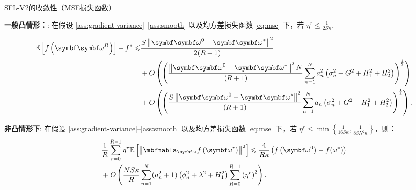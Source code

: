 \begin{theorem}{SFL-V2的收敛性（MSE损失函数）}\label{theorem-v2-full-mse}

\noindent \textbf{一般凸情形：}:  在假设 \ref{ass:gradient-variance}--\ref{ass:smooth} 以及均方差损失函数 \eqref{eq:mse} 下，若 $\eta^r \leq \frac{1}{2 S\kappa}$, 

\begin{equation}\label{bound-v2-gc-full}
\begin{aligned}
\mathbb{E}\left[f\left(\boldsymbol{\omegab}^{R}\right)\right]-f^*\le &\frac{S\left\|\boldsymbol{\omegab}^{0}-\boldsymbol{\omegab}^{\ast}\right\|^2}{2(R+1)}\\ 
&+ O\left(\left(\frac{\left\|\boldsymbol{\omegab}^{0}-\boldsymbol{\omegab}^{\ast}\right\|^2 N}{(R+1)}\sum_{n=1}^Na_n^2\left(\sigma_n^2+G^2+H_1^2+H_2^2\right)\right)^{\frac{1}{2}}\right)\\
    &+O\left(\left(\frac{S \left\|\boldsymbol{\omegab}^{0}-\boldsymbol{\omegab}^{\ast}\right\|^2}{(R+1)}\sum_{n=1}^Na_n\left(\sigma_n^2+G^2+H_1^2+H_2^2\right)\right)^{\frac{1}{3}}\right).
\end{aligned}
\end{equation}

\noindent \textbf{非凸情形下}: 在假设 \ref{ass:gradient-variance}--\ref{ass:smooth} 以及均方差损失函数 \eqref{eq:mse} 下，若 
$\eta^r \leq \min\left\{ \frac{1}{16S\kappa},  \frac{1}{8SN^2\kappa}\right\}$，则：
\begin{equation}\label{bound-v2-nc-full}
\begin{aligned}
&\frac{1}{R}\sum_{r=0}^{R-1}\eta^r\mathbb{E}\left[\left\Vert
\nabla_{\omegab}f\left(\omegab^{r}\right)\right\Vert^2\right]\leq \frac{4}{R\kappa}\left(f\left(\omegab^{0}\right)-f(\omega^*)\right)\\
&+O\left(\frac{NS\kappa }{R} \sum_{n=1}^N(a_n^2+1)\left(\phi_n^2+\lambda^2+H_1^2\right)\sum_{R=0}^{R-1}\left(\eta^r\right)^2\right).
\end{aligned}
\end{equation}
\end{theorem}
